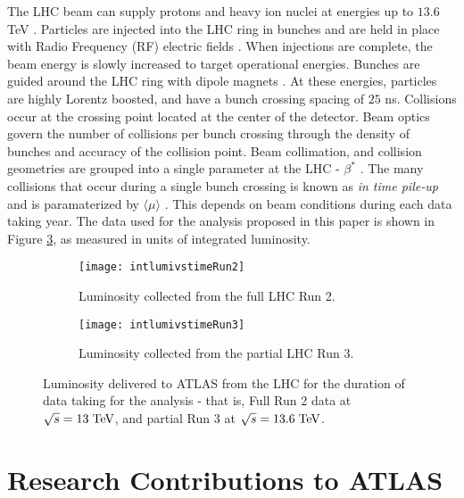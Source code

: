 \documentclass[12pt]{article}
\begin{document}
The LHC beam can supply protons and heavy ion nuclei at energies up to $13.6$
TeV \cite{Aad_2024}. Particles are injected into the LHC ring in bunches and are
held in place with Radio Frequency (RF) electric fields
\cite{bunch_filling_schemes_bailey}. When injections are complete, the beam
energy is slowly increased to target operational energies. Bunches are guided
around the LHC ring with dipole magnets \cite{The_ATLAS_Collaboration_2008,
bunch_filling_schemes_bailey}. At these energies, particles are highly Lorentz
boosted, and have a bunch crossing spacing of $25$ ns. Collisions occur at the
crossing point located at the center of the detector. Beam optics govern the
number of collisions per bunch crossing through the density of bunches and
accuracy of the collision point. Beam collimation, and collision geometries are
grouped into a single parameter at the LHC - $\beta^*$ \cite{Aad_2024,
bunch_filling_schemes_bailey}. The many collisions that occur during a single
bunch crossing is known as \textit{in time pile-up} and is paramaterized by
$\langle\mu\rangle$ \cite{Aad_2024}. This depends on beam conditions during each
data taking year. The data used for the analysis proposed in this paper is shown
in Figure \ref{fig:lhc_luminosity}, as measured in units of integrated
luminosity.

\begin{figure}[t!]
    \centering
    \begin{subfigure}[t]{.48\textwidth}
        \centering
        \texttt{[image: intlumivstimeRun2]}
        \caption{Luminosity collected from the full LHC Run 2.}
        \label{subfig:lumi_run2}
    \end{subfigure}
    \hfill
    \begin{subfigure}[t]{.48\textwidth}
        \centering
        \texttt{[image: intlumivstimeRun3]}
        \caption{Luminosity collected from the partial LHC Run 3.}
        \label{subfig:lumi_run3}
    \end{subfigure}
\caption{Luminosity delivered to ATLAS from the LHC for the duration of data
taking for the analysis - that is, Full Run 2 data at $\sqrt{s}=13\;\text{TeV}$, and
partial Run 3 at $\sqrt{s}=13.6\;\text{TeV}$.} %
\label{fig:lhc_luminosity}
\end{figure}

\section{Research Contributions to ATLAS}
\end{document}
